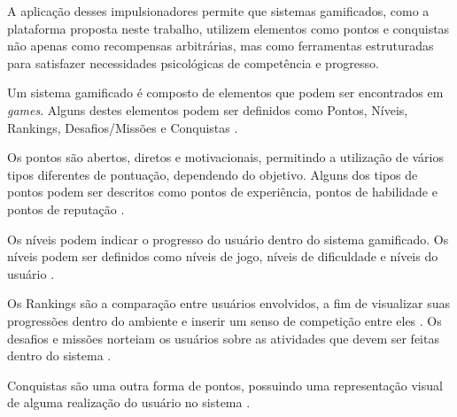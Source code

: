 A aplicação desses impulsionadores permite que sistemas gamificados, como a plataforma proposta neste trabalho, utilizem elementos como pontos e conquistas não apenas como recompensas arbitrárias, mas como ferramentas estruturadas para satisfazer necessidades psicológicas de competência e progresso.

Um sistema gamificado é composto de elementos que podem ser encontrados em \textit{games}. Alguns destes elementos podem ser definidos como Pontos, Níveis, Rankings, Desafios/Missões e Conquistas \cite{klock2014gamificacaoAVA}.

Os pontos são abertos, diretos e motivacionais, permitindo a utilização de vários tipos diferentes de pontuação, dependendo do objetivo. Alguns dos tipos de pontos podem ser descritos como pontos de experiência, pontos de habilidade e pontos de reputação \cite{zichermann2011gamificacao}.

Os níveis podem indicar o progresso do usuário dentro do sistema gamificado. Os níveis podem ser definidos como níveis de jogo, níveis de dificuldade e níveis do usuário \cite{zichermann2011gamificacao}.

Os Rankings são a comparação entre usuários envolvidos, a fim de visualizar suas progressões dentro do ambiente e inserir um senso de competição entre eles \cite{klock2014gamificacaoAVA}. Os desafios e missões norteiam os usuários sobre as atividades que devem ser feitas dentro do sistema \cite{fadel2014gamificacao}.

Conquistas são uma outra forma de pontos, possuindo uma representação visual de alguma realização do usuário no sistema \cite{hunter2012gamificacao}.



